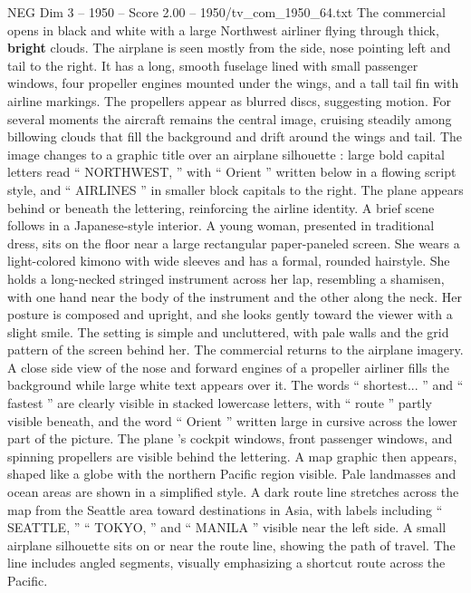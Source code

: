 \begin{textsample}{NEG Dim 3 – 1950 – Score 2.00 – 1950/tv\_com\_1950\_64.txt}  \label{ex:f3_neg_088}
The commercial opens in black and white with a large Northwest airliner flying through thick, \textbf{bright} clouds.
The airplane is seen mostly from the side, nose pointing left and tail to the right.
It has a long, smooth fuselage lined with small passenger windows, four propeller engines mounted under the wings, and a tall tail fin with airline markings.
The propellers appear as blurred discs, suggesting motion.
For several moments the aircraft remains the central image, cruising steadily among billowing clouds that fill the background and drift around the wings and tail.
The image changes to a graphic title over an airplane silhouette : large bold capital letters read “ NORTHWEST, ” with “ Orient ” written below in a flowing script style, and “ AIRLINES ” in smaller block capitals to the right.
The plane appears behind or beneath the lettering, reinforcing the airline identity.
A brief scene follows in a Japanese-style interior.
A young woman, presented in traditional dress, sits on the floor near a large rectangular paper-paneled screen.
She wears a light-colored kimono with wide sleeves and has a formal, rounded hairstyle.
She holds a long-necked stringed instrument across her lap, resembling a shamisen, with one hand near the body of the instrument and the other along the neck.
Her posture is composed and upright, and she looks gently toward the viewer with a slight smile.
The setting is simple and uncluttered, with pale walls and the grid pattern of the screen behind her.
The commercial returns to the airplane imagery.
A close side view of the nose and forward engines of a propeller airliner fills the background while large white text appears over it.
The words “ shortest... ” and “ fastest ” are clearly visible in stacked lowercase letters, with “ route ” partly visible beneath, and the word “ Orient ” written large in cursive across the lower part of the picture.
The plane ’s cockpit windows, front passenger windows, and spinning propellers are visible behind the lettering.
A map graphic then appears, shaped like a globe with the northern Pacific region visible.
Pale landmasses and ocean areas are shown in a simplified style.
A dark route line stretches across the map from the Seattle area toward destinations in Asia, with labels including “ SEATTLE, ” “ TOKYO, ” and “ MANILA ” visible near the left side.
A small airplane silhouette sits on or near the route line, showing the path of travel.
The line includes angled segments, visually emphasizing a shortcut route across the Pacific.

\end{textsample}
